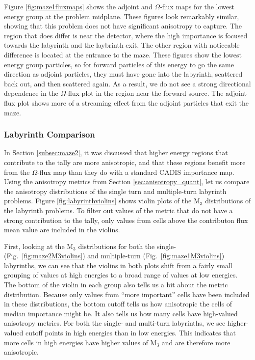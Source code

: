 Figure \ref{fig:maze1fluxmaps} shows the adjoint and $\Omega$-flux maps for the
lowest energy group at the problem midplane.
These figures look remarkably similar, showing that this problem does not have
significant anisotropy to capture. The region that does differ is near the
detector, where the high importance is focused towards the
labyrinth and the laybrinth exit. The other region with noticeable difference is
located at the entrance to the maze. These figures show the lowest energy group
particles, so for forward particles of this energy to go the same direction as
adjoint particles, they must have gone into the labyrinth, scattered back out,
and then scattered again. As a result, we do not see a strong directional
dependence in the $\Omega$-flux plot in the region near the forward source. The
adjoint flux plot shows more of a streaming effect from the adjoint particles
that exit the maze.

\subsubsection{Labyrinth Comparison}
In Section \ref{subsec:maze2}, it was discussed that higher energy regions that
contribute to the tally are more anisotropic, and that these regions benefit
more from the $\Omega$-flux map than they do with a standard CADIS importance
map. Using the anisotropy metrics from Section \ref{sec:anisotropy_quant}, let
us compare the anisotropy distributions of the single turn and multiple-turn
labyrinth problems. Figure \ref{fig:labyrinthviolins} shows violin plots of the
M$_{3}$ distributions of the labyrinth problems. To filter out values of the
metric that do not have a strong contribution to the
tally, only values from cells above the contributon flux mean value are included
in the violins.


First, looking at the M$_{3}$ distributions for both the single-
(Fig.~\ref{fig:maze2M3violins}) and
multiple-turn (Fig.~\ref{fig:maze1M3violins}) labyrinths, we can see that the violins
in both plots shift from a fairly small grouping of values at high energies to a
broad range of values at low energies. The bottom of the violin in each
group also tells us a
bit about the metric distribution. Because only values from ``more important''
cells have been included in these distributions, the bottom cutoff tells us how
anisotropic the cells of median importance might be. It also tells us how many
cells have high-valued anisotropy metrics. For both the single- and
multi-turn labyrinths, we see higher-valued cutoff points in high energies than
in low energies. This indicates that more cells in high energies have higher
values of M$_3$ and are therefore more anisotropic.

